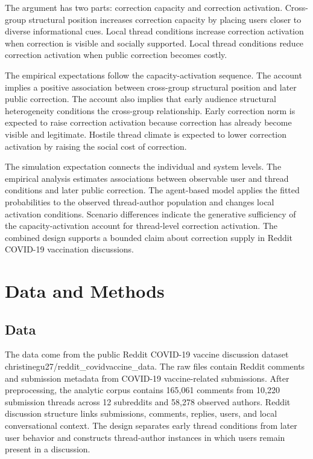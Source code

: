 \documentclass[namedate,unnumsec,webpdf,contemporary,large]{oup-authoring-template}
\begin{document}
The argument has two parts: correction capacity and correction activation. Cross-group structural position increases correction capacity by placing users closer to diverse informational cues. Local thread conditions increase correction activation when correction is visible and socially supported. Local thread conditions reduce correction activation when public correction becomes costly.

The empirical expectations follow the capacity-activation sequence. The account implies a positive association between cross-group structural position and later public correction. The account also implies that early audience structural heterogeneity conditions the cross-group relationship. Early correction norm is expected to raise correction activation because correction has already become visible and legitimate. Hostile thread climate is expected to lower correction activation by raising the social cost of correction.

The simulation expectation connects the individual and system levels. The empirical analysis estimates associations between observable user and thread conditions and later public correction. The agent-based model applies the fitted probabilities to the observed thread-author population and changes local activation conditions. Scenario differences indicate the generative sufficiency of the capacity-activation account for thread-level correction activation. The combined design supports a bounded claim about correction supply in Reddit COVID-19 vaccination discussions.

\section{Data and Methods}

\subsection{Data}


The data come from the public Reddit COVID-19 vaccine discussion dataset christinegu27/reddit\_covidvaccine\_data. The raw files contain Reddit comments and submission metadata from COVID-19 vaccine-related submissions. After preprocessing, the analytic corpus contains 165,061 comments from 10,220 submission threads across 12 subreddits and 58,278 observed authors. Reddit discussion structure links submissions, comments, replies, users, and local conversational context. The design separates early thread conditions from later user behavior and constructs thread-author instances in which users remain present in a discussion.
\end{document}
